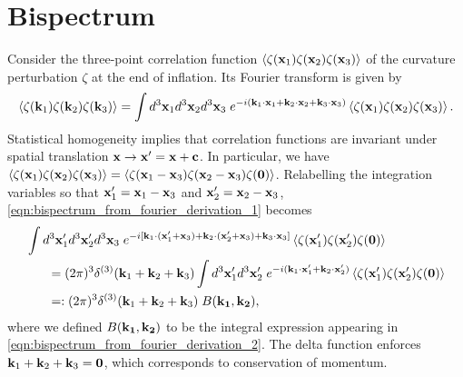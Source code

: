 \section{Bispectrum} \label{section:bispectrum}

Consider the three-point correlation function $\left< \zeta(\mathbf{x}_1) \zeta(\mathbf{x}_2) \zeta(\mathbf{x}_3) \right>$  of the curvature perturbation $\zeta$ at the end of inflation. Its Fourier transform is given by
\begin{align}
	\left< \zeta(\mathbf{k}_1) \zeta(\mathbf{k}_2) \zeta(\mathbf{k}_3) \right> = \int d^3\mathbf{x}_1 d^3\mathbf{x}_2 d^3\mathbf{x}_3 \; e^{-i(\mathbf{k}_1 \cdot \mathbf{x}_1 + \mathbf{k}_2 \cdot \mathbf{x}_2 + \mathbf{k}_3 \cdot \mathbf{x}_3 )} \left< \zeta(\mathbf{x}_1) \zeta(\mathbf{x}_2) \zeta(\mathbf{x}_3) \right>. \label{eqn:bispectrum_from_fourier_derivation_1}
\end{align}
Statistical homogeneity implies that correlation functions are invariant under spatial translation $\mathbf{x} \rightarrow \mathbf{x}' = \mathbf{x} + \mathbf{c}$. In particular, we have $\left< \zeta(\mathbf{x}_1) \zeta(\mathbf{x}_2) \zeta(\mathbf{x}_3) \right> = \left< \zeta(\mathbf{x}_1 - \mathbf{x}_3) \zeta(\mathbf{x}_2 - \mathbf{x}_3) \zeta(\mathbf{0}) \right>$. Relabelling the integration variables so that $\mathbf{x}'_1=\mathbf{x}_1-\mathbf{x}_3$ and $\mathbf{x}'_2=\mathbf{x}_2-\mathbf{x}_3$, \eqref{eqn:bispectrum_from_fourier_derivation_1} becomes
\begin{align}
	&\int d^3\vv{x}'_1 d^3\vv{x}'_2 d^3\vv{x}_3 \; e^{-i[ \vv{k}_1 \cdot (\vv{x}'_1 + \vv{x}_3) + \vv{k}_2 \cdot (\vv{x}'_2 + \vv{x}_3) + \vv{k}_3 \cdot \vv{x}_3 ]} \left< \zeta(\vv{x}'_1) \zeta(\vv{x}'_2) \zeta(\vv{0}) \right> \nonumber \\
	&\hspace{0.05\textwidth} = (2\pi)^3 \delta^{(3)}(\vv{k}_1 + \vv{k}_2 + \vv{k}_3) \int d^3\vv{x}'_1 d^3\vv{x}'_2 \; e^{-i( \vv{k}_1 \cdot \vv{x}'_1 + \vv{k}_2 \cdot \vv{x}'_2)} \left< \zeta(\vv{x}'_1) \zeta(\vv{x}'_2) \zeta(\vv{0}) \right> \label{eqn:bispectrum_from_fourier_derivation_2}\\
	&\hspace{0.05\textwidth} =: (2\pi)^3 \delta^{(3)}(\vv{k}_1 + \vv{k}_2 + \vv{k}_3) \; B(\vv{k_1}, \vv{k_2}), \label{eqn:bispectrum_from_fourier_derivation_3}
\end{align}
where we defined $B(\mathbf{k_1}, \mathbf{k_2})$ to be the integral expression appearing in \eqref{eqn:bispectrum_from_fourier_derivation_2}. The delta function enforces $\mathbf{k}_1 + \mathbf{k}_2 + \mathbf{k}_3 = \mathbf{0}$, which corresponds to conservation of momentum.

